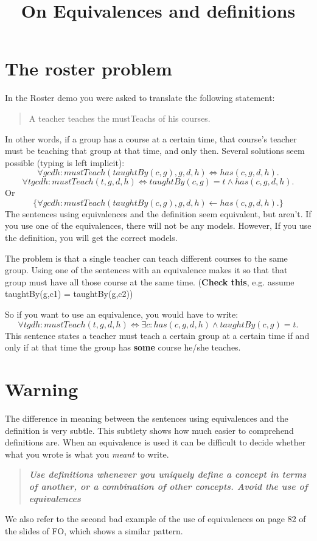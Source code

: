 \documentclass[a4paper,10pt]{article}
\title{On Equivalences and definitions}
\author{\vspace{-2ex}}
\date{}
\begin{document}
\maketitle
\section*{The roster problem}
In the Roster demo you were asked to translate the following statement: 
\begin{quote}
 A teacher teaches the mustTeachs of his courses.
\end{quote}
In other words, if a group has a course at a certain time, that course's teacher must be teaching that group at that time, and only then. 
Several solutions seem possible (typing is left implicit): 
\[ \forall g c d h : mustTeach(taughtBy(c,g),g,d,h) \Leftrightarrow has(c,g,d,h) . \]
\[ \forall t g c d h : mustTeach(t,g,d,h) \Leftrightarrow taughtBy(c,g) = t \wedge has(c,g,d,h) . \]
Or
\[
 \{ \forall g c d h : mustTeach(taughtBy(c,g),g,d,h) \leftarrow has(c,g,d,h).\}
\]
The sentences using equivalences and the definition seem equivalent, but aren't. If you use one of the equivalences, there will not be any models. 
However, If you use the definition, you will get the correct models.

The problem is that a single teacher can teach different courses to the same group. 
Using one of the sentences with an equivalence makes it so that that group must have all those course at the same time. (\textbf{Check this}, e.g. assume taughtBy(g,c1) = taughtBy(g,c2))

So if you want to use an equivalence, you would have to write: 
\[ \forall t g d h : mustTeach(t,g,d,h) \Leftrightarrow \exists c : has(c,g,d,h) \wedge taughtBy(c,g) = t .\]
This sentence states a teacher must teach a certain group at a certain time if and only if at that time the group has \textbf{some} course he/she teaches.
\section*{Warning}
The difference in meaning between the sentences using equivalences and the definition is very subtle. This subtlety shows how much easier to comprehend definitions are. When an equivalence is used it can be difficult to decide whether what you wrote is what you \emph{meant} to write. 
\begin{quote}
  \centering \textbf{\emph{Use definitions whenever you uniquely define a concept in terms of another, or a combination of other concepts. Avoid the use of equivalences}}
\end{quote}
We also refer to the second bad example of the use of equivalences on page
82 of the slides of FO, which shows a similar pattern.
\end{document}
